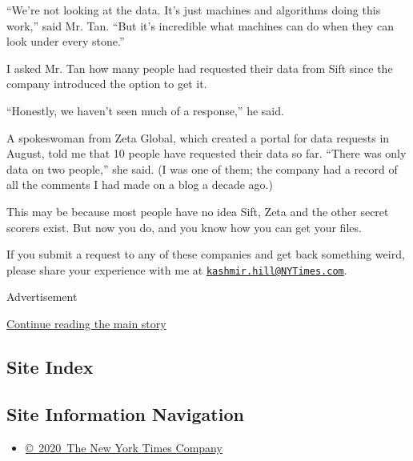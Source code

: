 ``We're not looking at the data. It's just machines and algorithms doing
this work,'' said Mr. Tan. ``But it's incredible what machines can do
when they can look under every stone.''

I asked Mr. Tan how many people had requested their data from Sift since
the company introduced the option to get it.

``Honestly, we haven't seen much of a response,'' he said.

A spokeswoman from Zeta Global, which created a portal for data requests
in August, told me that 10 people have requested their data so far.
``There was only data on two people,'' she said. (I was one of them; the
company had a record of all the comments I had made on a blog a decade
ago.)

This may be because most people have no idea Sift, Zeta and the other
secret scorers exist. But now you do, and you know how you can get your
files.

If you submit a request to any of these companies and get back something
weird, please share your experience with me at
\href{mailto:kashmir.hill@NYTimes.com}{\nolinkurl{kashmir.hill@NYTimes.com}}.

Advertisement

\protect\hyperlink{after-bottom}{Continue reading the main story}

\hypertarget{site-index}{%
\subsection{Site Index}\label{site-index}}

\hypertarget{site-information-navigation}{%
\subsection{Site Information
Navigation}\label{site-information-navigation}}

\begin{itemize}
\tightlist
\item
  \href{https://help.nytimes3xbfgragh.onion/hc/en-us/articles/115014792127-Copyright-notice}{©~2020~The
  New York Times Company}
\end{itemize}

